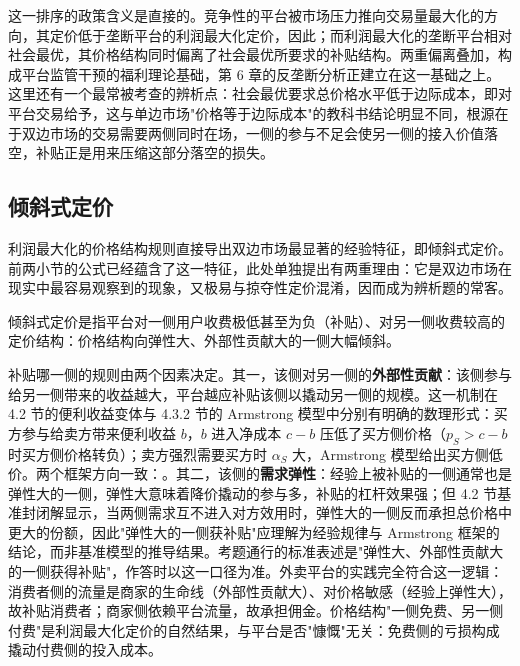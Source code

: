 这一排序的政策含义是直接的。竞争性的平台被市场压力推向交易量最大化的方向，其定价低于垄断平台的利润最大化定价，因此；而利润最大化的垄断平台相对社会最优，其价格结构同时偏离了社会最优所要求的补贴结构。两重偏离叠加，构成平台监管干预的福利理论基础，第 6 章的反垄断分析正建立在这一基础之上。这里还有一个最常被考查的辨析点：社会最优要求总价格水平低于边际成本，即对平台交易给予，这与单边市场"价格等于边际成本"的教科书结论明显不同，根源在于双边市场的交易需要两侧同时在场，一侧的参与不足会使另一侧的接入价值落空，补贴正是用来压缩这部分落空的损失。

\subsection{倾斜式定价}

利润最大化的价格结构规则直接导出双边市场最显著的经验特征，即倾斜式定价。前两小节的公式已经蕴含了这一特征，此处单独提出有两重理由：它是双边市场在现实中最容易观察到的现象，又极易与掠夺性定价混淆，因而成为辨析题的常客。

\begin{definition}
倾斜式定价是指平台对一侧用户收费极低甚至为负（补贴）、对另一侧收费较高的定价结构：价格结构向弹性大、外部性贡献大的一侧大幅倾斜。
\end{definition}

补贴哪一侧的规则由两个因素决定。其一，该侧对另一侧的\textbf{外部性贡献}：该侧参与给另一侧带来的收益越大，平台越应补贴该侧以撬动另一侧的规模。这一机制在 4.2 节的便利收益变体与 4.3.2 节的 Armstrong 模型中分别有明确的数理形式：买方参与给卖方带来便利收益 $b$，$b$ 进入净成本 $c-b$ 压低了买方侧价格（$p_S > c-b$ 时买方侧价格转负）；卖方强烈需要买方时 $\alpha_S$ 大，Armstrong 模型给出买方侧低价。两个框架方向一致：。其二，该侧的\textbf{需求弹性}：经验上被补贴的一侧通常也是弹性大的一侧，弹性大意味着降价撬动的参与多，补贴的杠杆效果强；但 4.2 节基准封闭解显示，当两侧需求互不进入对方效用时，弹性大的一侧反而承担总价格中更大的份额，因此"弹性大的一侧获补贴"应理解为经验规律与 Armstrong 框架的结论，而非基准模型的推导结果。考题通行的标准表述是"弹性大、外部性贡献大的一侧获得补贴"，作答时以这一口径为准。外卖平台的实践完全符合这一逻辑：消费者侧的流量是商家的生命线（外部性贡献大）、对价格敏感（经验上弹性大），故补贴消费者；商家侧依赖平台流量，故承担佣金。价格结构"一侧免费、另一侧付费"是利润最大化定价的自然结果，与平台是否"慷慨"无关：免费侧的亏损构成撬动付费侧的投入成本。

